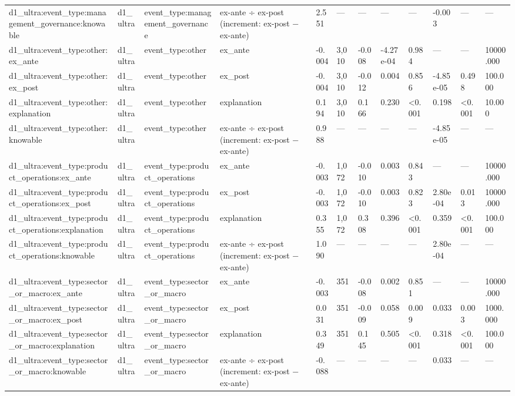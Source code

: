 \begin{tabular}{llllllllllll}
d1\_ultra:event\_type:management\_governance:knowable & d1\_ultra & event\_type:management\_governance & ex-ante ÷ ex-post (increment: ex-post − ex-ante) & 2.551 & — & — & — & — & -0.003 & — & — \\
d1\_ultra:event\_type:other:ex\_ante & d1\_ultra & event\_type:other & ex\_ante & -0.004 & 3,010 & -0.008 & -4.27e-04 & 0.984 & — & — & 10000.000 \\
d1\_ultra:event\_type:other:ex\_post & d1\_ultra & event\_type:other & ex\_post & -0.004 & 3,010 & -0.012 & 0.004 & 0.856 & -4.85e-05 & 0.498 & 100.000 \\
d1\_ultra:event\_type:other:explanation & d1\_ultra & event\_type:other & explanation & 0.194 & 3,010 & 0.166 & 0.230 & <0.001 & 0.198 & <0.001 & 10.000 \\
d1\_ultra:event\_type:other:knowable & d1\_ultra & event\_type:other & ex-ante ÷ ex-post (increment: ex-post − ex-ante) & 0.988 & — & — & — & — & -4.85e-05 & — & — \\
d1\_ultra:event\_type:product\_operations:ex\_ante & d1\_ultra & event\_type:product\_operations & ex\_ante & -0.003 & 1,072 & -0.010 & 0.003 & 0.843 & — & — & 10000.000 \\
d1\_ultra:event\_type:product\_operations:ex\_post & d1\_ultra & event\_type:product\_operations & ex\_post & -0.003 & 1,072 & -0.010 & 0.003 & 0.823 & 2.80e-04 & 0.013 & 10000.000 \\
d1\_ultra:event\_type:product\_operations:explanation & d1\_ultra & event\_type:product\_operations & explanation & 0.355 & 1,072 & 0.308 & 0.396 & <0.001 & 0.359 & <0.001 & 100.000 \\
d1\_ultra:event\_type:product\_operations:knowable & d1\_ultra & event\_type:product\_operations & ex-ante ÷ ex-post (increment: ex-post − ex-ante) & 1.090 & — & — & — & — & 2.80e-04 & — & — \\
d1\_ultra:event\_type:sector\_or\_macro:ex\_ante & d1\_ultra & event\_type:sector\_or\_macro & ex\_ante & -0.003 & 351 & -0.008 & 0.002 & 0.851 & — & — & 10000.000 \\
d1\_ultra:event\_type:sector\_or\_macro:ex\_post & d1\_ultra & event\_type:sector\_or\_macro & ex\_post & 0.031 & 351 & -0.009 & 0.058 & 0.009 & 0.033 & 0.003 & 1000.000 \\
d1\_ultra:event\_type:sector\_or\_macro:explanation & d1\_ultra & event\_type:sector\_or\_macro & explanation & 0.349 & 351 & 0.145 & 0.505 & <0.001 & 0.318 & <0.001 & 100.000 \\
d1\_ultra:event\_type:sector\_or\_macro:knowable & d1\_ultra & event\_type:sector\_or\_macro & ex-ante ÷ ex-post (increment: ex-post − ex-ante) & -0.088 & — & — & — & — & 0.033 & — & — \\
\bottomrule
\end{tabular}

